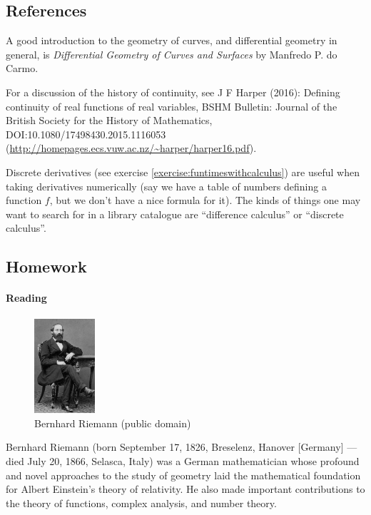 \subsection{References}
A good introduction to the geometry of curves, and differential geometry in general, is \emph{Differential Geometry
of Curves and Surfaces} by Manfredo P. do Carmo.

For a discussion of the history of continuity, see J F Harper (2016): Defining continuity of
real functions of real variables, BSHM Bulletin: Journal of the British Society for the History
of Mathematics, DOI:10.1080/17498430.2015.1116053 (\url{http://homepages.ecs.vuw.ac.nz/~harper/harper16.pdf}).

Discrete derivatives (see exercise \ref{exercise:funtimeswithcalculus}) are useful when taking
derivatives numerically (say we have a table of numbers defining a function $ f $, but we don't
have a nice formula for it). The kinds of things one may want to search for in a library catalogue
are ``difference calculus'' or ``discrete calculus''.

\subsection{Homework}
\paragraph{Reading}
\begin{figure}
  \centering
  \includegraphics[width=0.2\textwidth]{riemann}
  \caption{Bernhard Riemann (public domain)}
\end{figure}
Bernhard Riemann (born September 17, 1826, Breselenz, Hanover [Germany] --- died July 20, 1866, Selasca, Italy) was a German mathematician whose profound and novel approaches to the study of geometry laid the mathematical foundation for Albert Einstein's theory of relativity. He also made important contributions to the theory of functions, complex analysis, and number theory.

